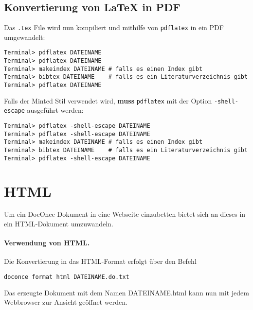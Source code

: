 \documentclass[%
oneside,                 %
final,                   %
chapterprefix=true,      %
open=right,              %
10pt]{book}
\begin{document}
\noindent
\subsection{Konvertierung von {\LaTeX} in PDF}
Das \texttt{.tex} File wird nun kompiliert und mithilfe von \texttt{pdflatex} in ein PDF umgewandelt:
\begin{verbatim}
Terminal> pdflatex DATEINAME
Terminal> pdflatex DATEINAME
Terminal> makeindex DATEINAME # falls es einen Index gibt
Terminal> bibtex DATEINAME    # falls es ein Literaturverzeichnis gibt
Terminal> pdflatex DATEINAME
\end{verbatim}

Falls der Minted Stil verwendet wird, \textbf{muss} \texttt{pdflatex} mit der Option \texttt{-shell-escape} ausgeführt werden:
\begin{verbatim}
Terminal> pdflatex -shell-escape DATEINAME
Terminal> pdflatex -shell-escape DATEINAME
Terminal> makeindex DATEINAME # falls es einen Index gibt
Terminal> bibtex DATEINAME    # falls es ein Literaturverzeichnis gibt
Terminal> pdflatex -shell-escape DATEINAME
\end{verbatim}
\section{HTML}
Um ein DocOnce Dokument in eine Webseite einzubetten bietet sich an dieses in ein HTML-Dokument umzuwandeln.
\paragraph{ Verwendung von HTML.}
Die Konvertierung in das HTML-Format erfolgt über den Befehl
\begin{verbatim}
doconce format html DATEINAME.do.txt
\end{verbatim}
Das erzeugte Dokument mit dem Namen DATEINAME.html kann nun mit jedem Webbrowser zur Ansicht geöffnet werden.
\end{document}

